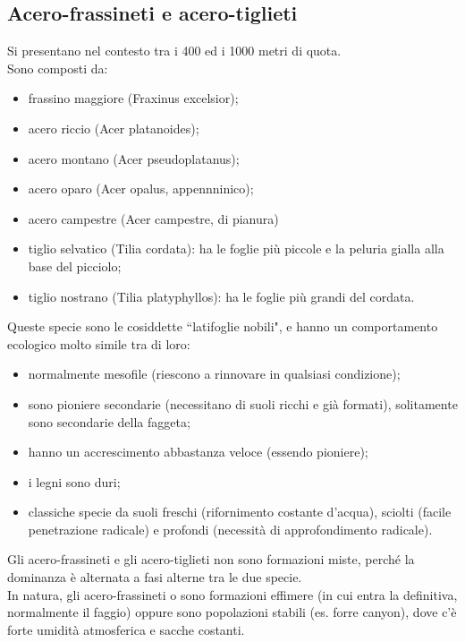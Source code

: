 \subsection{Acero-frassineti e acero-tiglieti}
Si presentano nel contesto tra i 400 ed i 1000 metri di quota.\\
Sono composti da: 
\begin{itemize}[nosep]
    \item frassino maggiore (Fraxinus excelsior);
    \item acero riccio (Acer platanoides);
    \item acero montano (Acer pseudoplatanus);
    \item acero oparo (Acer opalus, appennninico);
    \item acero campestre (Acer campestre, di pianura)
    \item tiglio selvatico (Tilia cordata): ha le foglie più piccole e la peluria gialla alla base del picciolo;
    \item tiglio nostrano (Tilia platyphyllos): ha le foglie più grandi del cordata.
\end{itemize}
Queste specie sono le cosiddette ``latifoglie nobili", e hanno un comportamento ecologico molto simile tra di loro:
\begin{itemize}[nosep]
    \item normalmente mesofile (riescono a rinnovare in qualsiasi condizione);
    \item sono pioniere secondarie (necessitano di suoli ricchi e già formati), solitamente sono secondarie della faggeta;
    \item hanno un accrescimento abbastanza veloce (essendo pioniere);
    \item i legni sono duri;
    \item classiche specie da suoli freschi (rifornimento costante d'acqua), sciolti (facile penetrazione radicale) e profondi (necessità di approfondimento radicale).
\end{itemize}
Gli acero-frassineti e gli acero-tiglieti non sono formazioni miste, perché la dominanza è alternata a fasi alterne tra le due specie.\\
In natura, gli acero-frassineti o sono formazioni effimere (in cui entra la definitiva, normalmente il faggio) oppure sono popolazioni stabili (es. forre canyon), dove c'è forte umidità atmosferica e sacche costanti.
